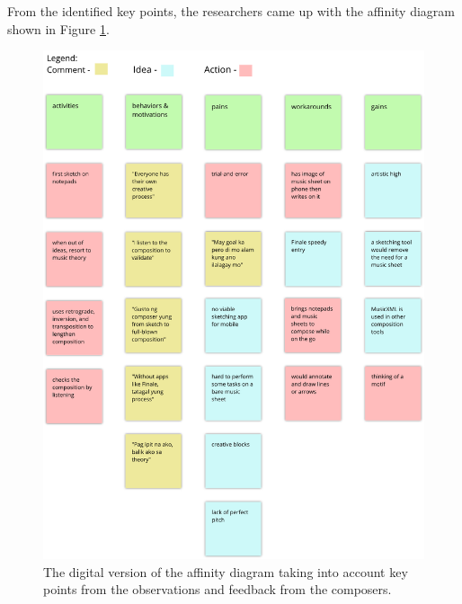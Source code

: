 	\newpage
	From the identified key points, the researchers came up with the affinity diagram shown in Figure \ref{fig:affinity-diagram}. 

	\begin{figure}[H]
		\centering
		\includegraphics[scale=0.45]{figures/affinity_diagram.png}
	    \caption{The digital version of the affinity diagram taking into account key points from the observations and feedback from the composers. }
	    \label{fig:affinity-diagram}
	\end{figure} 
		

		
